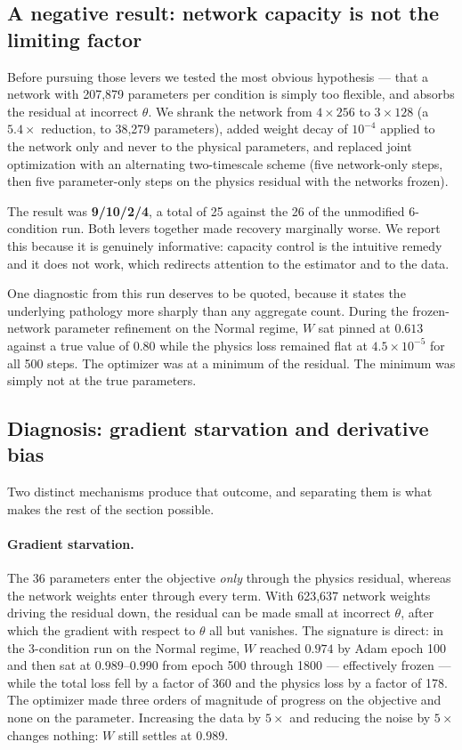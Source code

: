 \documentclass[11pt]{article}
\begin{document}
\subsection{A negative result: network capacity is not the limiting factor}

Before pursuing those levers we tested the most obvious hypothesis --- that a
network with 207,879 parameters per condition is simply too flexible, and
absorbs the residual at incorrect $\theta$. We shrank the network from
$4\times256$ to $3\times128$ (a $5.4\times$ reduction, to 38,279 parameters),
added weight decay of $10^{-4}$ applied to the network only and never to the
physical parameters, and replaced joint optimization with an alternating
two-timescale scheme (five network-only steps, then five parameter-only steps
on the physics residual with the networks frozen).

The result was \textbf{9/10/2/4}, a total of 25 against the 26 of the
unmodified 6-condition run. Both levers together made recovery marginally
worse. We report this because it is genuinely informative: capacity control is
the intuitive remedy and it does not work, which redirects attention to the
estimator and to the data.

One diagnostic from this run deserves to be quoted, because it states the
underlying pathology more sharply than any aggregate count. During the
frozen-network parameter refinement on the Normal regime, $W$ sat pinned at
$0.613$ against a true value of $0.80$ while the physics loss remained flat at
$4.5\times10^{-5}$ for all 500 steps. The optimizer was at a minimum of the
residual. The minimum was simply not at the true parameters.

\subsection{Diagnosis: gradient starvation and derivative bias}

Two distinct mechanisms produce that outcome, and separating them is what makes
the rest of the section possible.

\paragraph{Gradient starvation.} The 36 parameters enter the objective
\emph{only} through the physics residual, whereas the network weights enter
through every term. With 623,637 network weights driving the residual down, the
residual can be made small at incorrect $\theta$, after which the gradient with
respect to $\theta$ all but vanishes. The signature is direct: in the
3-condition run on the Normal regime, $W$ reached $0.974$ by Adam epoch 100 and
then sat at $0.989$--$0.990$ from epoch 500 through 1800 --- effectively frozen
--- while the total loss fell by a factor of 360 and the physics loss by a
factor of 178. The optimizer made three orders of magnitude of progress on the
objective and none on the parameter. Increasing the data by $5\times$ and
reducing the noise by $5\times$ changes nothing: $W$ still settles at $0.989$.
\end{document}
